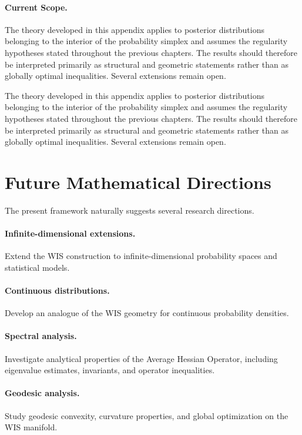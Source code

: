 \paragraph{Current Scope.}
The theory developed in this appendix applies to posterior distributions
belonging to the interior of the probability simplex and assumes the
regularity hypotheses stated throughout the previous chapters.  The
results should therefore be interpreted primarily as structural and
geometric statements rather than as globally optimal inequalities.
Several extensions remain open.



The theory developed in this appendix applies to posterior distributions
belonging to the interior of the probability simplex and assumes the
regularity hypotheses stated throughout the previous chapters.  The
results should therefore be interpreted primarily as structural and
geometric statements rather than as globally optimal inequalities.
Several extensions remain open.

\section{Future Mathematical Directions}

The present framework naturally suggests several research directions.

\paragraph{Infinite-dimensional extensions.}
Extend the WIS construction to infinite-dimensional probability spaces
and statistical models.

\paragraph{Continuous distributions.}
Develop an analogue of the WIS geometry for continuous probability
densities.

\paragraph{Spectral analysis.}
Investigate analytical properties of the Average Hessian Operator,
including eigenvalue estimates, invariants, and operator inequalities.

\paragraph{Geodesic analysis.}
Study geodesic convexity, curvature properties, and global optimization
on the WIS manifold.

